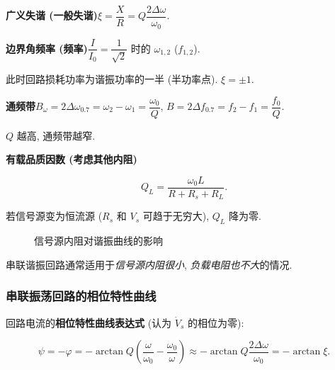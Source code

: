 \textbf{广义失谐 (一般失谐)}\quad $\xi=\dfrac{X}{R}=Q\dfrac{2\Delta\omega}{\omega_0}$.

\textbf{边界角频率 (频率)}\quad $\dfrac{I}{I_0}=\dfrac{1}{\sqrt{2}}$ 时的 $\omega_{1,2}$ ($f_{1,2}$).

此时回路损耗功率为谐振功率的一半 (半功率点). $\xi=\pm 1$.

\textbf{通频带}\quad $B_\omega=2\Delta\omega_{0.7}=\omega_2-\omega_1=\dfrac{\omega_0}{Q}$, $B=2\Delta f_{0.7}=f_2-f_1=\dfrac{f_0}{Q}$.

$Q$ 越高, 通频带越窄.

\textbf{有载品质因数 (考虑其他内阻)}

\begin{equation}
    Q_L=\frac{\omega_0L}{R+R_s+R_L}.
\end{equation}

若信号源变为恒流源 ($R_s$ 和 $V_s$ 可趋于无穷大), $Q_L$ 降为零.

\begin{figure}[H]
    \centering
    \caption{信号源内阻对谐振曲线的影响}
\end{figure}

串联谐振回路通常适用于\textit{信号源内阻很小}, \textit{负载电阻也不大}的情况.

\subsubsection{串联振荡回路的相位特性曲线} \label{串联振荡回路的相位特性曲线}

回路电流的\textbf{相位特性曲线表达式} (认为 $\dot{V}_s$ 的相位为零):

\begin{equation} \label{eq:2.1 psi}
    \psi=-\varphi=-\arctan Q\left(\frac{\omega}{\omega_0}-\frac{\omega_0}{\omega}\right)\approx-\arctan Q\frac{2\Delta\omega}{\omega_0}=-\arctan\xi.
\end{equation}

